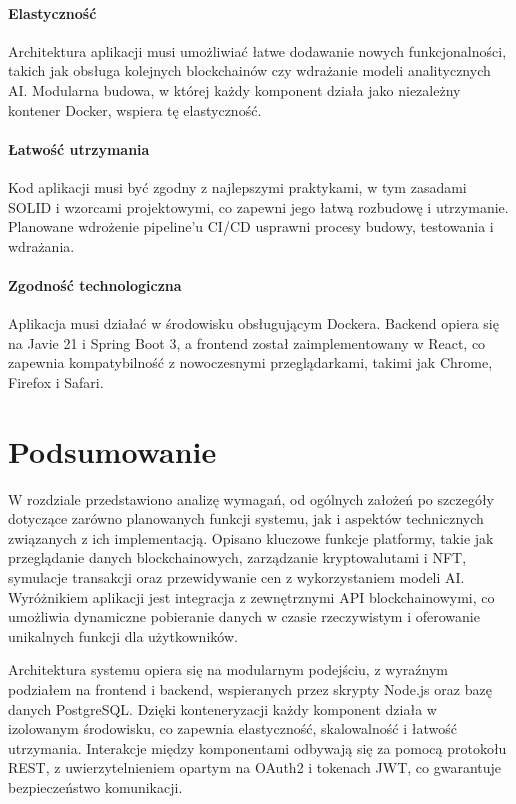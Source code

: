 \paragraph{Elastyczność}
Architektura aplikacji musi umożliwiać łatwe dodawanie nowych funkcjonalności, takich jak obsługa kolejnych blockchainów czy wdrażanie modeli analitycznych AI. Modularna budowa, w której każdy komponent działa jako niezależny kontener Docker, wspiera tę elastyczność.

\paragraph{Łatwość utrzymania}
Kod aplikacji musi być zgodny z najlepszymi praktykami, w tym zasadami SOLID i wzorcami projektowymi, co zapewni jego łatwą rozbudowę i utrzymanie. Planowane wdrożenie pipeline'u CI/CD usprawni procesy budowy, testowania i wdrażania.

\paragraph{Zgodność technologiczna}
Aplikacja musi działać w środowisku obsługującym Dockera. Backend opiera się na Javie 21 i Spring Boot 3, a frontend został zaimplementowany w React, co zapewnia kompatybilność z nowoczesnymi przeglądarkami, takimi jak Chrome, Firefox i Safari.


\section{Podsumowanie}

W rozdziale przedstawiono analizę wymagań, od ogólnych założeń po szczegóły dotyczące zarówno planowanych funkcji systemu, jak i aspektów technicznych związanych z ich implementacją. Opisano kluczowe funkcje platformy, takie jak przeglądanie danych blockchainowych, zarządzanie kryptowalutami i NFT, symulacje transakcji oraz przewidywanie cen z wykorzystaniem modeli AI. Wyróżnikiem aplikacji jest integracja z zewnętrznymi API blockchainowymi, co umożliwia dynamiczne pobieranie danych w czasie rzeczywistym i oferowanie unikalnych funkcji dla użytkowników.

Architektura systemu opiera się na modularnym podejściu, z wyraźnym podziałem na frontend i backend, wspieranych przez skrypty Node.js oraz bazę danych PostgreSQL. Dzięki konteneryzacji każdy komponent działa w izolowanym środowisku, co zapewnia elastyczność, skalowalność i łatwość utrzymania. Interakcje między komponentami odbywają się za pomocą protokołu REST, z uwierzytelnieniem opartym na OAuth2 i tokenach JWT, co gwarantuje bezpieczeństwo komunikacji.

